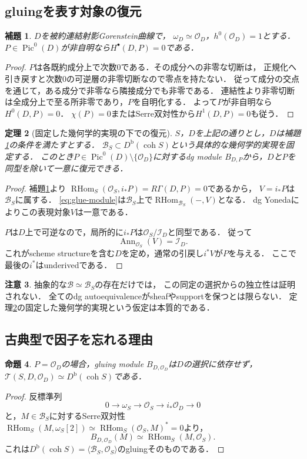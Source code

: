 \documentclass[11pt,a4paper]{ltjsarticle}
\newtheorem{theorem}{定理}[section]
\newtheorem{proposition}[theorem]{命題}
\newtheorem{lemma}[theorem]{補題}
\theoremstyle{definition}
\newtheorem{remark}[theorem]{注意}
\newcommand{\OO}{\mathcal O}
\newcommand{\BB}{\mathcal B}
\newcommand{\TT}{\mathcal T}
\newcommand{\Db}{D^{\mathrm b}}
\newcommand{\RHom}{\operatorname{RHom}}
\newcommand{\coh}{\operatorname{coh}}
\newcommand{\Pic}{\operatorname{Pic}}
\newcommand{\Ann}{\operatorname{Ann}}
\begin{document}
\subsection{gluingを表す対象の復元}
\begin{lemma}\label{lem:acyclic}
$D$を被約連結射影Gorenstein曲線で，
$\omega_D\simeq\OO_D$，$h^0(\OO_D)=1$とする．
$P\in\Pic^0(D)$が非自明なら$H^\bullet(D,P)=0$である．
\end{lemma}
\begin{proof}
$P$は各既約成分上で次数0である．その成分への非零な切断は，
正規化へ引き戻すと次数0の可逆層の非零切断なので零点を持たない．
従って成分の交点を通じて，ある成分で非零なら隣接成分でも非零である．
連結性より非零切断は全成分上で至る所非零であり，$P$を自明化する．
よって$P$が非自明なら$H^0(D,P)=0$．
$\chi(P)=0$またはSerre双対性から$H^1(D,P)=0$も従う．
\end{proof}

\begin{theorem}[固定した幾何学的実現の下での復元]\label{thm:yoneda}
$S$，$D$を上記の通りとし，$D$は補題\ref{lem:acyclic}の条件を満たすとする．
$\BB_S\subset\Db(\coh S)$という\emph{具体的な幾何学的実現}を固定する．
このとき$P\in\Pic^0(D)\setminus\{\OO_D\}$に対するdg module
$B_{D,P}$から，$D$と$P$を同型を除いて一意に復元できる．
\end{theorem}
\begin{proof}
補題\ref{lem:acyclic}より
$\RHom_S(\OO_S,i_*P)=R\Gamma(D,P)=0$であるから，
$V=i_*P$は$\BB_S$に属する．
\eqref{eq:glue-module}は$\BB_S$上で$\RHom_{\BB_S}(-,V)$となる．
dg Yonedaによりこの表現対象$V$は一意である．

$P$は$D$上で可逆なので，局所的に$i_*P$は$\OO_S/\mathcal I_D$と同型である．
従って
\begin{equation}\label{eq:ann}
 \Ann_{\OO_S}(V)=\mathcal I_D.
\end{equation}
これがscheme structureを含む$D$を定め，通常の引戻し$i^*V$が$P$を与える．
ここで最後の$i^*$はunderivedである．
\end{proof}

\begin{remark}
抽象的な$\BB\simeq\BB_S$の存在だけでは，
この同定の選択からの独立性は証明されない．
全てのdg autoequivalenceがsheafやsupportを保つとは限らない．
定理\ref{thm:yoneda}の固定した幾何学的実現という仮定は本質的である．
\end{remark}

\subsection{古典型で因子を忘れる理由}
\begin{proposition}\label{prop:classical}
$P=\OO_D$の場合，gluing module $B_{D,\OO_D}$は$D$の選択に依存せず，
$\TT(S,D,\OO_D)\simeq\Db(\coh S)$である．
\end{proposition}
\begin{proof}
反標準列
\[
 0\longrightarrow\omega_S\longrightarrow\OO_S
 \longrightarrow i_*\OO_D\longrightarrow0
\]
と，$M\in\BB_S$に対するSerre双対性
$\RHom_S(M,\omega_S[2])\simeq\RHom_S(\OO_S,M)^*=0$より，
\[
 B_{D,\OO_D}(M)\simeq\RHom_S(M,\OO_S).
\]
これは$\Db(\coh S)=\langle\BB_S,\OO_S\rangle$のgluingそのものである．
\end{proof}
\end{document}

